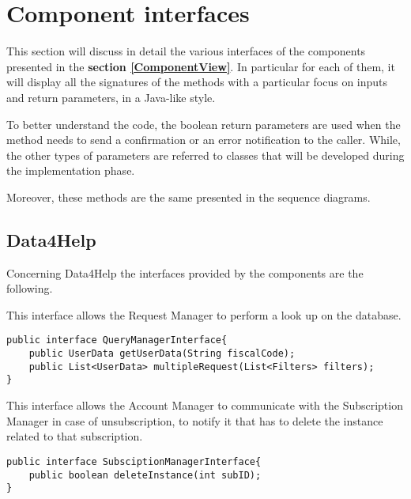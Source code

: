 \section{Component interfaces}
\label{componentInterfaces}




This section will discuss in detail the various interfaces of the components presented in the \textbf{section \ref{ComponentView}}. In particular for each of them, it will display all the signatures of the methods with a particular focus on inputs and return parameters, in a Java-like style.

To better understand the code, the boolean return parameters are used when the method needs to send a confirmation or an error notification to the caller. While, the other types of parameters are referred to classes that will be developed during the implementation phase.

Moreover, these methods are the same presented in the sequence diagrams.


\subsection{Data4Help}

Concerning Data4Help the interfaces provided by the components are the following.

This interface allows the Request Manager to perform a look up on the database.
\begin{lstlisting}
public interface QueryManagerInterface{
	public UserData getUserData(String fiscalCode);
	public List<UserData> multipleRequest(List<Filters> filters);
}
\end{lstlisting}

This interface allows the Account Manager to communicate with the Subscription Manager in case of unsubscription, to notify it that has to delete the instance related to that subscription.
\begin{lstlisting}
public interface SubsciptionManagerInterface{
	public boolean deleteInstance(int subID);
}
\end{lstlisting}


